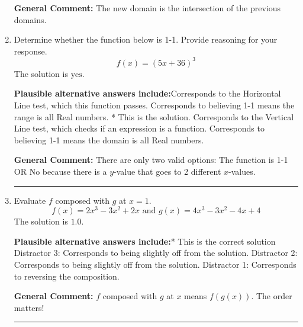 \documentclass{extbook}[14pt]
\newcommand{\litem}[1]{\item #1

\rule{\textwidth}{0.4pt}}
\begin{document}
\begin{enumerate}
{\begin{enumerate}[label=\Alph*.]
\end{enumerate}

\textbf{General Comment:} The new domain is the intersection of the previous domains.
}
\litem{
Determine whether the function below is 1-1. Provide reasoning for your response.
\[ f(x) = (5 x + 36)^3 \]The solution is \( \text{yes} \).\begin{enumerate}[label=\Alph*.]
\textbf{Plausible alternative answers include:}Corresponds to the Horizontal Line test, which this function passes.
Corresponds to believing 1-1 means the range is all Real numbers.
* This is the solution.
Corresponds to the Vertical Line test, which checks if an expression is a function.
Corresponds to believing 1-1 means the domain is all Real numbers.
\end{enumerate}

\textbf{General Comment:} There are only two valid options: The function is 1-1 OR No because there is a $y$-value that goes to 2 different $x$-values.
}
\litem{
Evaluate $f$ composed with $g$ at $x=1$.
\[ f(x) = 2x^{3} -3 x^{2} +2 x \text{ and } g(x) = 4x^{3} -3 x^{2} -4 x + 4 \]The solution is \( 1.0 \).\begin{enumerate}[label=\Alph*.]
\textbf{Plausible alternative answers include:}* This is the correct solution
 Distractor 3: Corresponds to being slightly off from the solution.
 Distractor 2: Corresponds to being slightly off from the solution.
 Distractor 1: Corresponds to reversing the composition.

\end{enumerate}

\textbf{General Comment:} $f$ composed with $g$ at $x$ means $f(g(x))$. The order matters!
}
\end{enumerate}
\end{document}
